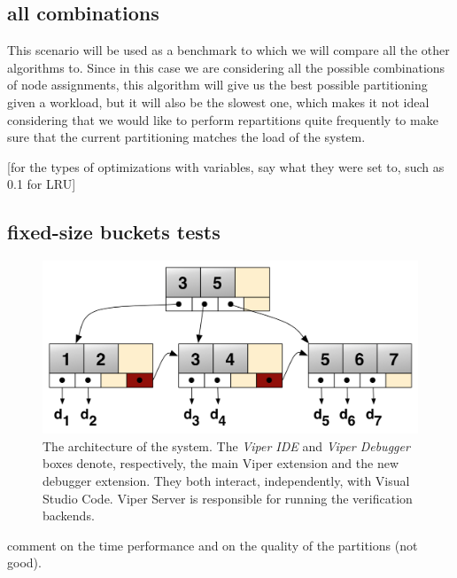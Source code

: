 \subsection{all combinations}\label{sec:all-combinations}
This scenario will be used as a benchmark to which we will compare all the other algorithms to. Since in this case we are considering all the possible combinations of node assignments, this algorithm will give us the best possible partitioning given a workload, but it will also be the slowest one, which makes it not ideal considering that we would like to perform repartitions quite frequently to make sure that the current partitioning matches the load of the system.

[for the types of optimizations with variables, say what they were set to, such as 0.1 for LRU]
\subsection{fixed-size buckets tests}\label{sec:fixed-size buckets-tests}
\begin{figure}[htb]
  \centering
  \includegraphics[width=\textwidth,height=\textheight,keepaspectratio]{img/b+tree.png}
  \caption[The architecture of the system]{ The architecture of the system. The
    \textit{Viper IDE} and \textit{Viper Debugger} boxes denote, respectively,
    the main Viper extension and the new debugger extension. They both interact,
    independently, with Visual Studio Code. Viper Server is responsible for
    running the verification backends.}
  \label{fig:b+tree}
\end{figure}

comment on the time performance and on the quality of the partitions (not good).
